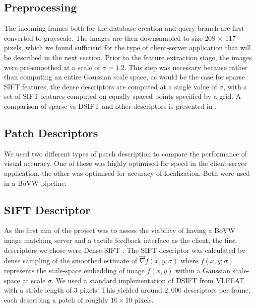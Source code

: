 \subsection{Preprocessing}

The incoming frames both for the database creation and query branch are first converted to grayscale. The images are then downsampled to size 208 $\times$ 117 pixels, which we found sufficient for the type of client-server application that will be described in the next section. Prior to the feature extraction stage, the images were pre-smoothed at a scale of $\sigma = 1.2$. This step was necessary because rather than computing an entire Gaussian scale space, as would be the case for sparse SIFT features, the dense descriptors are computed at a single value of $\sigma$, with a set of SIFT features computed on equally spaced points specified by a grid. A comparison of sparse vs DSIFT and other descriptors is presented in \citep{Rivera-Rubio2015PRL}.

\subsection{Patch Descriptors}
We used two different types of patch description to compare the performance of visual accuracy.  One of these was highly optimised for speed in the client-server application, the other was optimised for accuracy of localization.  Both were used in a BoVW pipeline.


\subsection{SIFT Descriptor}
As the first aim of the project was to assess the viability of having a BoVW image matching server and a tactile feedback interface as the client, the first descriptors we chose were Dense-SIFT \citep{Lowe1999,LazebnikSP06,Vedaldi2008}.  The SIFT descriptor was calculated by dense sampling of the smoothed estimate of $\vec{\nabla}f(x,y;\sigma)$ where $f(x,y;\sigma)$ represents the scale-space embedding of image $f(x,y)$ within a Gaussian scale-space at scale $\sigma$.  We used a standard implementation of DSIFT from VLFEAT~\citep{Vedaldi2008} with a stride length of 3 pixels. This yielded around $2,000$ descriptors per frame, each describing a patch of roughly $10 \times 10$ pixels.

